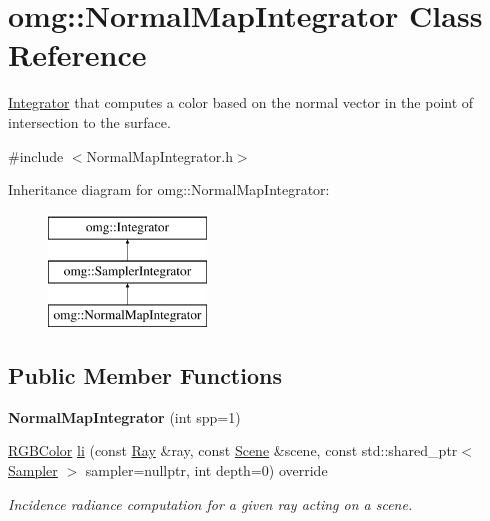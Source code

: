 \hypertarget{classomg_1_1_normal_map_integrator}{}\section{omg\+::Normal\+Map\+Integrator Class Reference}
\label{classomg_1_1_normal_map_integrator}


\mbox{\hyperlink{classomg_1_1_integrator}{Integrator}} that computes a color based on the normal vector in the point of intersection to the surface.  




{\ttfamily \#include $<$Normal\+Map\+Integrator.\+h$>$}

Inheritance diagram for omg\+::Normal\+Map\+Integrator\+:\begin{figure}[H]
\begin{center}
\leavevmode
\includegraphics[height=3.000000cm]{classomg_1_1_normal_map_integrator}
\end{center}
\end{figure}
\subsection*{Public Member Functions}
\begin{DoxyCompactItemize}
\item 
\mbox{\label{classomg_1_1_normal_map_integrator_aa4d9ed6bdd12e53abd250c9b5101aba9}} 
{\bfseries Normal\+Map\+Integrator} (int spp=1)
\item 
\mbox{\hyperlink{namespaceomg_a7b0e3f3dcf76f2b4758c314a41885917}{R\+G\+B\+Color}} \mbox{\hyperlink{classomg_1_1_normal_map_integrator_a8cdb4a7e141018712f63a58d158e3214}{li}} (const \mbox{\hyperlink{classomg_1_1_ray}{Ray}} \&ray, const \mbox{\hyperlink{classomg_1_1_scene}{Scene}} \&scene, const std\+::shared\+\_\+ptr$<$ \mbox{\hyperlink{classomg_1_1_sampler}{Sampler}} $>$ sampler=nullptr, int depth=0) override
\begin{DoxyCompactList}\small\item\em Incidence radiance computation for a given ray acting on a scene. \end{DoxyCompactList}\end{DoxyCompactItemize}
